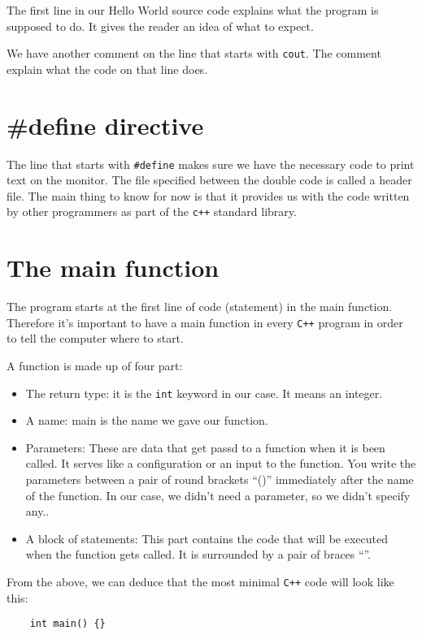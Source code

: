 \documentclass{book}
\begin{document}
The first line in our Hello World source code explains what the program is supposed to do. It gives the reader an idea of what to expect.

We have another comment on the line that starts with \verb|cout|. The comment explain what the code on that line does.

\section{\#define directive}
The line that starts with \verb|#define| makes sure we have the necessary code to print text on the monitor. The file specified between the double code is called a header file. The main thing to know for now is that it provides us with the code written by other programmers as part of the \verb|c++| standard library.

\section{The main function}
The program starts at the first line of code (statement) in the main function. Therefore it's important to have a main function in every \verb|C++| program in order to tell the computer where to start.

A function is made up of four part:

\begin{itemize}
	\item The return type: it is the \verb|int| keyword in our case. It means an integer.
	\item A name: main is the name we gave our function.
	\item Parameters: These are data that get passd to a function when it is been called. It serves like a configuration or an input to the function. You write the parameters between a pair of round brackets ``()'' immediately after the name of the function. In our case, we didn't need a parameter, so we didn't specify any..
	\item A block of statements: This part contains the code that will be executed when the function gets called. It is surrounded by a pair of braces ``{}''.
\end{itemize}

From the above, we can deduce that the most minimal \verb|C++| code will look like this:

\begin{verbatim}
	int main() {}
\end{verbatim}
\end{document}

